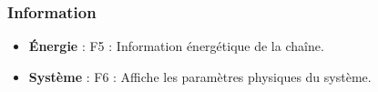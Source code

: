 \subsubsection{Information}
\begin{itemize}[label=, leftmargin=2cm, itemsep=0pt]
\item {\bf Énergie} : {\sf F5} : Information énergétique de la chaîne.
\item {\bf Système} : {\sf F6} : Affiche les paramètres physiques du système.
\end{itemize}
%
